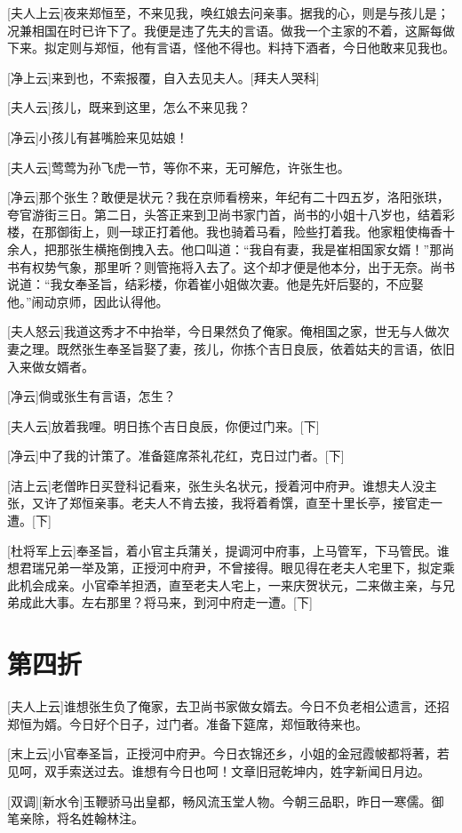 \documentclass{book}
\newcommand\nchapter[1]{\chapter*{#1}\markboth{#1}{}\addcontentsline{toc}{chapter}{#1}}
\begin{document}
[夫人上云]夜来郑恒至，不来见我，唤红娘去问亲事。据我的心，则是与孩儿是；况兼相国在时已许下了。我便是违了先夫的言语。做我一个主家的不着，这厮每做下来。拟定则与郑恒，他有言语，怪他不得也。料持下酒者，今日他敢来见我也。

[净上云]来到也，不索报覆，自入去见夫人。[拜夫人哭科]

[夫人云]孩儿，既来到这里，怎么不来见我？

[净云]小孩儿有甚嘴脸来见姑娘！

[夫人云]莺莺为孙飞虎一节，等你不来，无可解危，许张生也。

[净云]那个张生？敢便是状元？我在京师看榜来，年纪有二十四五岁，洛阳张珙，夸官游街三日。第二日，头答正来到卫尚书家门首，尚书的小姐十八岁也，结着彩楼，在那御街上，则一球正打着他。我也骑着马看，险些打着我。他家粗使梅香十余人，把那张生横拖倒拽入去。他口叫道：``我自有妻，我是崔相国家女婿！''那尚书有权势气象，那里听？则管拖将入去了。这个却才便是他本分，出于无奈。尚书说道：``我女奉圣旨，结彩楼，你着崔小姐做次妻。他是先奸后娶的，不应娶他。''闹动京师，因此认得他。

[夫人怒云]我道这秀才不中抬举，今日果然负了俺家。俺相国之家，世无与人做次妻之理。既然张生奉圣旨娶了妻，孩儿，你拣个吉日良辰，依着姑夫的言语，依旧入来做女婿者。

[净云]倘或张生有言语，怎生？

[夫人云]放着我哩。明日拣个吉日良辰，你便过门来。[下]

[净云]中了我的计策了。准备筵席茶礼花红，克日过门者。[下]

[洁上云]老僧昨日买登科记看来，张生头名状元，授着河中府尹。谁想夫人没主张，又许了郑恒亲事。老夫人不肯去接，我将着肴馔，直至十里长亭，接官走一遭。[下]

[杜将军上云]奉圣旨，着小官主兵蒲关，提调河中府事，上马管军，下马管民。谁想君瑞兄弟一举及第，正授河中府尹，不曾接得。眼见得在老夫人宅里下，拟定乘此机会成亲。小官牵羊担洒，直至老夫人宅上，一来庆贺状元，二来做主亲，与兄弟成此大事。左右那里？将马来，到河中府走一遭。[下]

\nchapter{第四折}

[夫人上云]谁想张生负了俺家，去卫尚书家做女婿去。今日不负老相公遗言，还招郑恒为婿。今日好个日子，过门者。准备下筵席，郑恒敢待来也。

[末上云]小官奉圣旨，正授河中府尹。今日衣锦还乡，小姐的金冠霞帔都将著，若见呵，双手索送过去。谁想有今日也呵！文章旧冠乾坤内，姓字新闻日月边。

[双调][新水令]玉鞭骄马出皇都，畅风流玉堂人物。今朝三品职，昨日一寒儒。御笔亲除，将名姓翰林注。
\end{document}

